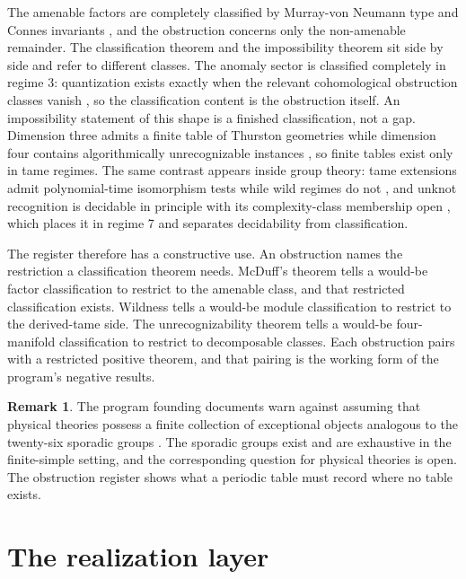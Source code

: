 \documentclass[11pt,letterpaper]{article}
\theoremstyle{definition}
\newtheorem{remark}[theorem]{Remark}
\begin{document}
The amenable factors are completely classified by Murray-von Neumann type and Connes invariants \cite{corpus-8,corpus-62,corpus-64}, and the obstruction concerns only the non-amenable remainder. The classification theorem and the impossibility theorem sit side by side and refer to different classes. The anomaly sector is classified completely in regime 3: quantization exists exactly when the relevant cohomological obstruction classes vanish \cite{corpus-19}, so the classification content is the obstruction itself. An impossibility statement of this shape is a finished classification, not a gap. Dimension three admits a finite table of Thurston geometries \cite{corpus-60,corpus-70} while dimension four contains algorithmically unrecognizable instances \cite{corpus-54}, so finite tables exist only in tame regimes. The same contrast appears inside group theory: tame extensions admit polynomial-time isomorphism tests while wild regimes do not \cite{corpus-57}, and unknot recognition is decidable in principle with its complexity-class membership open \cite{corpus-61}, which places it in regime 7 and separates decidability from classification.

The register therefore has a constructive use. An obstruction names the restriction a classification theorem needs. McDuff's theorem tells a would-be factor classification to restrict to the amenable class, and that restricted classification exists. Wildness tells a would-be module classification to restrict to the derived-tame side. The unrecognizability theorem tells a would-be four-manifold classification to restrict to decomposable classes. Each obstruction pairs with a restricted positive theorem, and that pairing is the working form of the program's negative results.

\begin{remark}
The program founding documents warn against assuming that physical theories possess a finite collection of exceptional objects analogous to the twenty-six sporadic groups \cite{corpus-1}. The sporadic groups exist and are exhaustive in the finite-simple setting, and the corresponding question for physical theories is open. The obstruction register shows what a periodic table must record where no table exists.
\end{remark}

\section{The realization layer}
\label{sec:realization}
\end{document}
